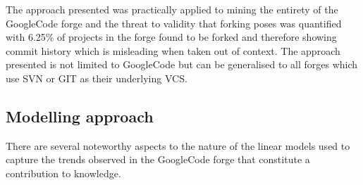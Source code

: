 \begin{itemize}
The approach presented was practically applied to mining the entirety of the GoogleCode forge and the threat to validity that forking poses was quantified with 6.25\% of projects in the forge found to be forked and therefore showing commit history which is misleading when taken out of context. The approach presented is not limited to GoogleCode but can be generalised to all forges which use SVN or GIT as their underlying VCS.
\end{itemize}

\subsection{Modelling approach}
There are several noteworthy aspects to the nature of the linear models used to capture the trends observed in the GoogleCode forge that constitute a contribution to knowledge.

